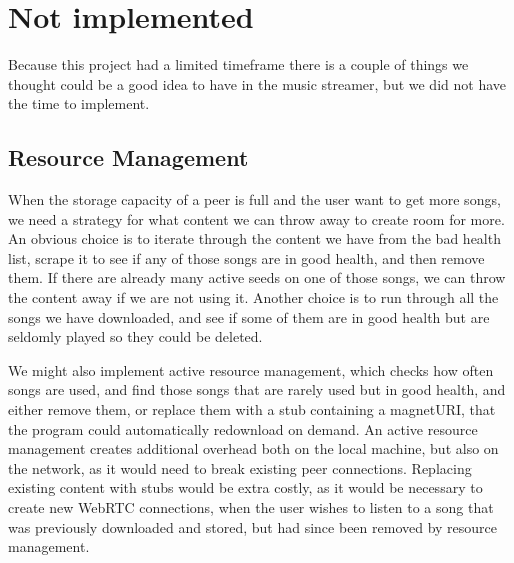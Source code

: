

\section{Not implemented}
Because this project had a limited timeframe there is a couple of things
we thought could be a good idea to have in the
music streamer, but we did not have the time to implement.

\subsection{Resource Management}
When the storage capacity of a peer is full and the user want to get more songs,
we need a strategy for what content we can throw away to create room for more.
An obvious choice is to iterate through the content we have from the bad health list,
scrape it to see if any of those songs are in good health,
and then remove them.
If there are already many active seeds on one of those songs,
we can throw the content away if we are not using it.
Another choice is to run through all the songs we have downloaded,
and see if some of them are in good health but are seldomly played so they could be deleted.

We might also implement active resource management, which checks how often songs are used,
and find those songs that are rarely used but in good health, and either remove them,
or replace them with a stub containing a magnetURI, 
that the program could automatically redownload on demand.
An active resource management creates additional overhead both on the local machine,
but also on the network, as it would need to break existing peer connections.
Replacing existing content with stubs would be extra costly,
as it would be necessary to create new WebRTC connections,
when the user wishes to listen to a song that was previously downloaded and stored,
but had since been removed by resource management.

